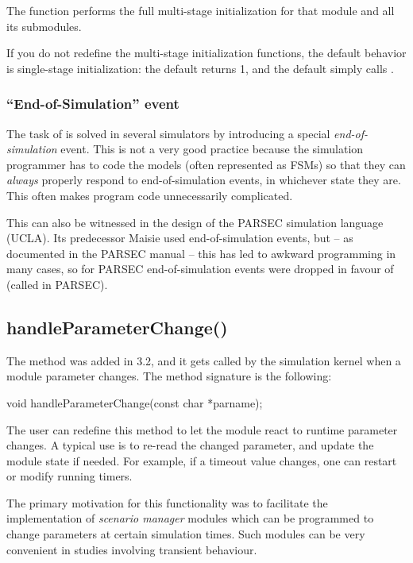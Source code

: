 The  function performs the full multi-stage initialization
for that module and all its submodules.

If you do not redefine the multi-stage initialization functions, the
default behavior is single-stage initialization: the default
 returns 1, and the default 
simply calls .


\subsubsection{``End-of-Simulation'' event}


The task of  is solved in several simulators
by introducing a special \textit{end-of-simulation} event.
This is not a very good practice because the simulation programmer has to
code the models (often represented as FSMs) so that they can \textit{always}
properly respond to end-of-simulation events, in whichever state they are. This
often makes program code unnecessarily complicated.

This can also be witnessed in the design of the PARSEC
simulation language (UCLA). Its predecessor Maisie used
end-of-simulation events, but -- as documented in the PARSEC manual --
this has led to awkward programming in many cases, so for PARSEC
end-of-simulation events were dropped in favour of 
(called  in PARSEC).


\subsection{handleParameterChange()}
\label{sec:simple-modules:handleParameterChange}

The  method was added in {\opp} 3.2,
and it gets called by the simulation kernel when a module parameter changes.
The method signature is the following:

\begin{cpp}
void handleParameterChange(const char *parname);
\end{cpp}

The user can redefine this method to let the module react to runtime parameter
changes. A typical use is to re-read the changed parameter, and update
the module state if needed. For example, if a timeout value changes,
one can restart or modify running timers.

The primary motivation for this functionality was to facilitate
the implementation of \textit{scenario manager} modules which
can be programmed to change parameters at certain simulation times.
Such modules can be very convenient in studies involving transient behaviour.

